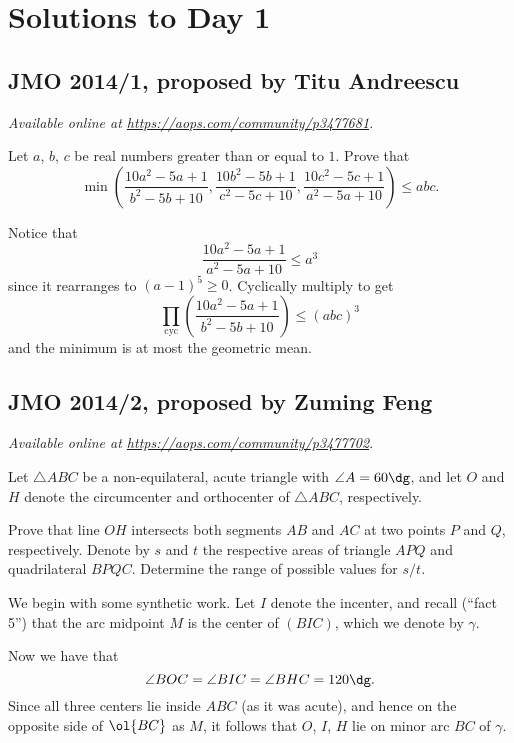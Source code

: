 \documentclass[11pt]{scrartcl}
\begin{document}
\section{Solutions to Day 1}
\subsection{JMO 2014/1, proposed by Titu Andreescu}
\textsl{Available online at \url{https://aops.com/community/p3477681}.}
\begin{mdframed}[style=mdpurplebox,frametitle={Problem statement}]
Let $a$, $b$, $c$ be real numbers greater than or equal to $1$.
Prove that
\[ \min \left( \frac{10a^2-5a+1}{b^2-5b+10},
  \frac{10b^2-5b+1}{c^2-5c+10},
  \frac{10c^2-5c+1}{a^2-5a+10} \right) \le abc. \]
\end{mdframed}
Notice that
\[ \frac{10a^2-5a+1}{a^2-5a+10} \le a^3 \]
since it rearranges to $(a-1)^5 \ge 0$.
Cyclically multiply to get
\[
  \prod_{\text{cyc}} \left( \frac{10a^2-5a+1}{b^2-5b+10} \right)
  \le (abc)^3
\]
and the minimum is at most the geometric mean.
\pagebreak

\subsection{JMO 2014/2, proposed by Zuming Feng}
\textsl{Available online at \url{https://aops.com/community/p3477702}.}
\begin{mdframed}[style=mdpurplebox,frametitle={Problem statement}]
Let $\triangle ABC $ be a non-equilateral,
acute triangle with $\angle A = 60\dg$,
and let $O$ and $H$ denote the circumcenter and orthocenter
of $\triangle{ABC}$, respectively.
\begin{enumerate}[(a)]
  \ii Prove that line $OH$ intersects both segments $AB$ and $AC$
  at two points $P$ and $Q$, respectively.
  \ii Denote by $s$ and $t$ the respective areas of triangle $APQ$
  and quadrilateral $BPQC$.
  Determine the range of possible values for $s/t$.
\end{enumerate}
\end{mdframed}
We begin with some synthetic work.
Let $I$ denote the incenter, and recall (``fact 5'')
that the arc midpoint $M$ is the center of $(BIC)$,
which we denote by $\gamma$.

Now we have that
\[ \angle BOC = \angle BIC = \angle BHC = 120\dg. \]
Since all three centers lie inside $ABC$ (as it was acute),
and hence on the opposite side of $\ol{BC}$ as $M$,
it follows that $O$, $I$, $H$ lie on minor arc $BC$ of $\gamma$.
\end{document}
